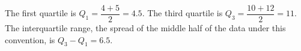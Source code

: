 The first quartile is $Q_1=\dfrac{4+5}{2}=4.5$. The third quartile is $Q_3=\dfrac{10+12}{2}=11$. The interquartile range, the spread of the middle half of the data under this convention, is $Q_3-Q_1=\boxed{6.5}$.
